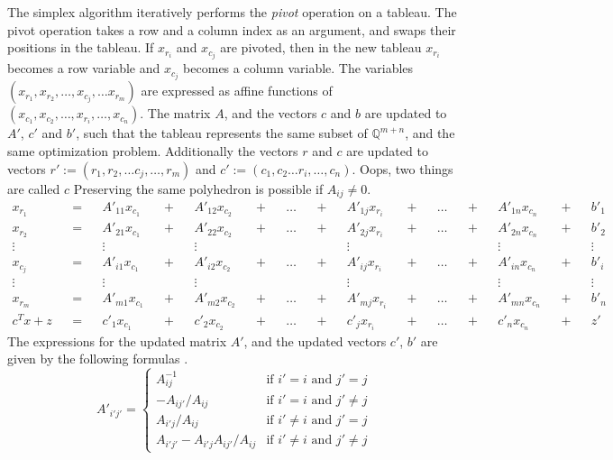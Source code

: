 \documentclass[11pt]{article} %
\begin{document}
The simplex algorithm iteratively performs the \textit{pivot} operation on a tableau. The pivot operation takes a row and a column index as an argument, and swaps their positions in the tableau. If $x_{r_i}$ and $x_{c_j}$ are pivoted, then in the new tableau $x_{r_i}$ becomes a row variable and $x_{c_j}$ becomes a column variable. The variables $(x_{r_1}, x_{r_2}, \dots, x_{c_j}, \dots x_{r_m})$ are expressed as affine functions of $(x_{c_1}, x_{c_2}, \dots, x_{r_i}, \dots, x_{c_n})$. The matrix $A$, and the vectors $c$ and $b$ are updated to $A'$, $c'$ and $b'$, such that the tableau represents the same subset of $\mathbb{Q}^{m + n}$, and the same optimization problem. Additionally the vectors $r$ and $c$ are updated to vectors $r' := (r_1, r_2, \dots c_j, \dots, r_m)$ and $c' := (c_1, c_2 \dots r_i, \dots, c_n)$. \color{red} Oops, two things are called $c$ \color{black} Preserving the same polyhedron is possible if $A_{ij} \ne 0$.
\begin{equation}
  \begin{aligned}
    x_{r_1} && = && A'_{11}x_{c_1} && + && A'_{12}x_{c_2} && + && \dots && + && A'_{1j}x_{r_i} && + && \dots && + && A'_{1n}x_{c_n} && + && b'_1\\
    x_{r_2} && = && A'_{21}x_{c_1} && + && A'_{22}x_{c_2} && + && \dots && + && A'_{2j}x_{r_i} && + && \dots && + && A'_{2n}x_{c_n} && + && b'_2\\
    \vdots && && \vdots && && \vdots && && && && \vdots && && && && \vdots && && \vdots \\
    x_{c_j} && = && A'_{i1}x_{c_1} && + && A'_{i2}x_{c_2} && + && \dots && + && A'_{ij}x_{r_i}&& + && \dots && + && A'_{in}x_{c_n} && + && b'_i\\
    \vdots && && \vdots && && \vdots && && && && \vdots && && && && \vdots && && \vdots \\
    x_{r_m} && = && A'_{m1}x_{c_1} && + && A'_{m2}x_{c_2} && + && \dots && + && A'_{mj}x_{r_i}&& + && \dots && + && A'_{mn}x_{c_n} && + && b'_n\\
    c^Tx + z && = && c'_1x_{c_1} && + && c'_2x_{c_2} && + && \dots && + && c'_jx_{r_i} && + && \dots && + && c'_nx_{c_n} && + && z'
  \end{aligned}
\end{equation}
The expressions for the updated matrix $A'$, and the updated vectors $c'$, $b'$ are given by the following formulas \cite{Nelson:1980:TPV:909447}.
\begin{equation}\label{eqn:pivot_tableau}
A'_{i'j'} = \begin{cases}
  A_{ij}^{-1} & \text{if } i' = i \text{ and } j' = j \\
  -A_{ij'}/A_{ij} & \text{if } i' = i \text{ and } j' \ne j \\
  A_{i'j}/A_{ij} & \text{if } i' \ne i \text{ and } j' = j \\
  A_{i'j'} - A_{i'j}A_{ij'}/A_{ij}  & \text{if } i' \ne i \text{ and } j' \ne j
\end{cases}
\end{equation}
\end{document}
